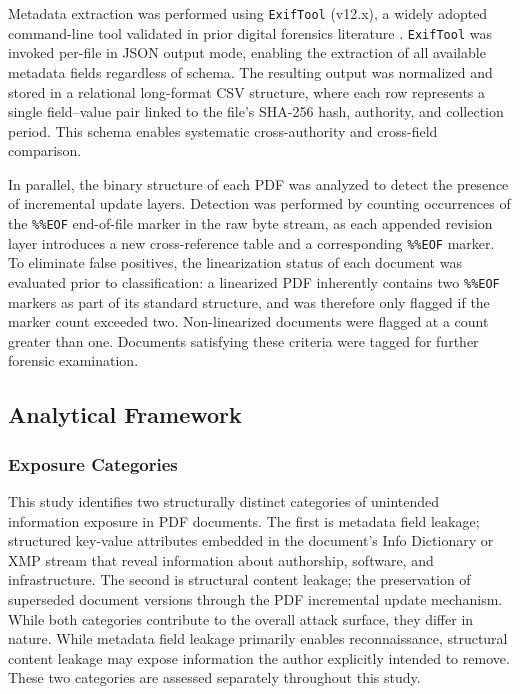 \documentclass[conference]{IEEEtran}
\begin{document}
Metadata extraction was performed using \texttt{ExifTool} (v12.x), a widely adopted command-line tool validated in prior digital forensics literature \cite{adhatarao2021}. \texttt{ExifTool} was invoked per-file in JSON output mode, enabling the extraction of all available metadata fields regardless of schema. The resulting output was normalized and stored in a relational long-format CSV structure, where each row represents a single field–value pair linked to the file's SHA-256 hash, authority, and collection period. This schema enables systematic cross-authority and cross-field comparison.

In parallel, the binary structure of each PDF was analyzed to detect the presence of incremental update layers. Detection was performed by counting occurrences of the \texttt{\%\%EOF} end-of-file marker in the raw byte stream, as each appended revision layer introduces a new cross-reference table and a corresponding \texttt{\%\%EOF} marker. To eliminate false positives, the linearization status of each document was evaluated prior to classification: a linearized PDF inherently contains two \texttt{\%\%EOF} markers as part of its standard structure, and was therefore only flagged if the marker count exceeded two. Non-linearized documents were flagged at a count greater than one. Documents satisfying these criteria were tagged for further forensic examination. 

\subsection{Analytical Framework}

\subsubsection{Exposure Categories}
This study identifies two structurally distinct categories of unintended information exposure in PDF documents. The first is metadata field leakage; structured key-value attributes embedded in the document's Info Dictionary or XMP stream that reveal information about authorship, software, and infrastructure. The second is structural content leakage; the preservation of superseded document versions through the PDF incremental update mechanism. While both categories contribute to the overall attack surface, they differ in nature. While metadata field leakage primarily enables reconnaissance, structural content leakage may expose information the author explicitly intended to remove. These two categories are assessed separately throughout this study.
\end{document}
